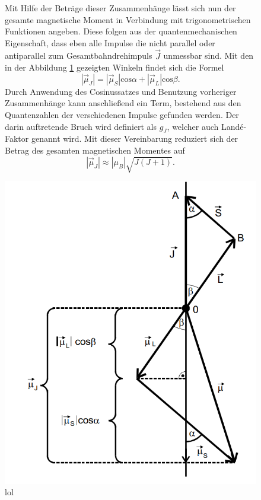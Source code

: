 \begin{figure}
\begin{minipage}[b]{0.5\textwidth}
Mit Hilfe der Beträge dieser Zusammenhänge lässt sich nun der gesamte magnetische Moment in Verbindung mit trigonometrischen Funktionen angeben.
Diese folgen aus der quantenmechanischen Eigenschaft, dass eben alle Impulse die nicht parallel oder antiparallel zum Gesamtbahndrehimpuls $\vec{J}$
unmessbar sind. Mit den in der Abbildung \ref{fig:winkel} gezeigten Winkeln findet sich die Formel
\begin{equation*}
    |\vec{\mu}_J| =  |\vec{\mu}_S|\text{cos}\alpha + |\vec{\mu}_L| \text{cos}\beta.
\end{equation*}
Durch Anwendung des Cosinussatzes und Benutzung vorheriger Zusammenhänge kann anschließend ein Term, bestehend aus den Quantenzahlen
der verschiedenen Impulse gefunden werden. Der darin auftretende Bruch wird definiert als $g_J$, welcher auch Landé-Faktor genannt wird.
Mit dieser Vereinbarung reduziert sich der Betrag des gesamten magnetischen Momentes auf
\begin{equation}
    \label{eqn:idkobdasüberhaubtsstimmtlol}
    |\vec{\mu}_J| \approx |\mu_B| \sqrt{J(J+1)}.
\end{equation}
\end{minipage}
\hfill
\begin{minipage}[b]{0.45\textwidth}
    \includegraphics[width=\textwidth]{bilder/winkel.png}
    \caption{lol}
    \label{fig:winkel}
\end{minipage}
\end{figure}
